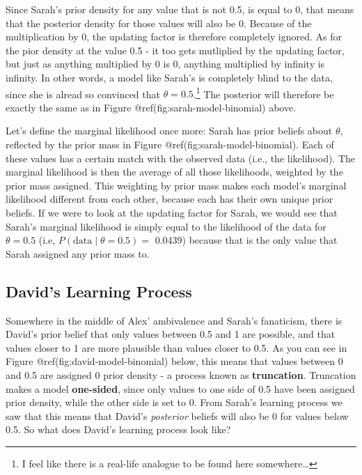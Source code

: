 \documentclass[
  letterpaper,
  DIV=11,
  numbers=noendperiod]{scrreprt}
\begin{document}
Since Sarah's prior density for any value that is not 0.5, is equal to
0, that means that the posterior density for those values will also be
0. Because of the multiplication by 0, the updating factor is therefore
completely ignored. As for the pior density at the value 0.5 - it too
gets mutliplied by the updating factor, but just as anything multiplied
by 0 is 0, anything multiplied by infinity is infinity. In other words,
a model like Sarah's is completely blind to the data, since she is
alread so convinced that \(\theta = 0.5\).\footnote{I feel like there is
  a real-life analogue to be found here somewhere\ldots{}} The posterior
will therefore be exactly the same as in Figure
@ref(fig:sarah-model-binomial) above.

Let's define the marginal likelihood once more: Sarah has prior beliefs
about \(\theta\), reflected by the prior mass in Figure
@ref(fig:sarah-model-binomial). Each of these values has a certain match
with the observed data (i.e., the likelihood). The marginal likelihood
is then the average of all those likelihoods, weighted by the prior mass
assigned. This weighting by prior mass makes each model's marginal
likelihood different from each other, because each has their own unique
prior beliefs. If we were to look at the updating factor for Sarah, we
would see that Sarah's marginal likelihood is simply equal to the
likelihood of the data for \(\theta = 0.5\) (i.e,
\(P(\text{data} \mid \theta = 0.5) =\) 0.0439) because that is the only
value that Sarah assigned any prior mass to.

\hypertarget{davids-learning-process}{%
\subsection{David's Learning Process}\label{davids-learning-process}}

Somewhere in the middle of Alex' ambivalence and Sarah's fanaticism,
there is David's prior belief that only values between 0.5 and 1 are
possible, and that values closer to 1 are more plausible than values
closer to 0.5. As you can see in Figure @ref(fig:david-model-binomial)
below, this means that values between 0 and 0.5 are assigned 0 prior
density - a process known as \textbf{truncation}. Truncation makes a
model \textbf{one-sided}, since only values to one side of 0.5 have been
assigned prior density, while the other side is set to 0. From Sarah's
learning process we saw that this means that David's \emph{posterior}
beliefs will also be 0 for values below 0.5. So what does David's
learning process look like?
\end{document}
